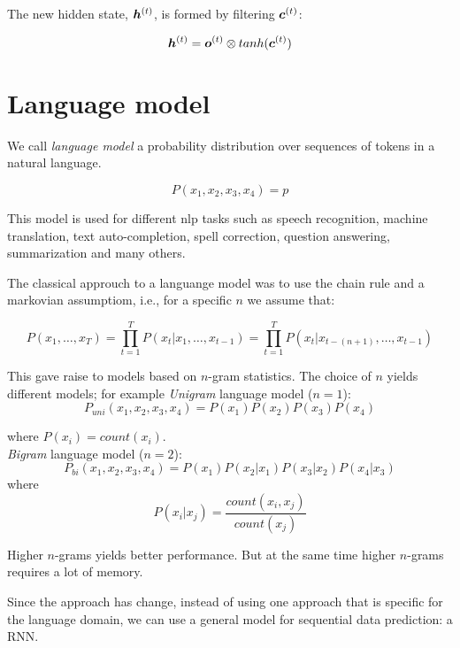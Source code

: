 The new hidden state, $\bm{h}^{(t)}$, is formed by filtering $\bm{c}^{(t)}$:

\begin{equation}
\bm{h}^{(t)} = \bm{o}^{(t)} \otimes tanh(\bm{c}^{(t)})
\end{equation}





\section{Language model}

We call \textit{language model} a probability distribution over sequences of tokens in a natural language.

\[
P(x_1,x_2,x_3,x_4) = p
\]

This model is used for different nlp tasks such as speech recognition, machine translation, text auto-completion, spell correction, question answering, summarization and many others.

The classical approuch to a languange model was to use the chain rule and a markovian assumptiom, i.e., for a specific $n$ we assume that:

\begin{equation}
P(x_1, \dots, x_T) = \prod_{t=1}^{T} P(x_t \vert x_1, \dots, x_{t-1}) = \prod_{t=1}^{T} P(x_{t} \vert x_{t - (n+1)}, \dots, x_{t-1})
\end{equation} 


This gave raise to models based on $n$-gram statistics. The choice of $n$ yields different models; for example 
\textit{Unigram} language model ($n=1$): 
\begin{equation}
P_{uni}(x_1, x_2, x_3, x_4) = P(x_1)P(x_2)P(x_3)P(x_4)
\end{equation}

where $P(x_i) = count(x_i)$.\\

\textit{Bigram} language model ($n=2$): 
\begin{equation}
P_{bi}(x_1,x_2,x_3,x_4) = P(x_1)P(x_2\vert x_1)P(x_3\vert x_2)P(x_4\vert x_3)
\end{equation} 
where
\[
P(x_i\vert x_j) = \frac{count(x_i, x_j)}{count(x_j)}
\]


Higher $n$-grams yields better performance. But at the same time higher $n$-grams requires a lot of memory\cite{Heafield}.

Since \cite{Mikolov11} the approach has change, instead of using one approach that is specific for the language domain, we can use a general model for sequential data prediction: a RNN.

